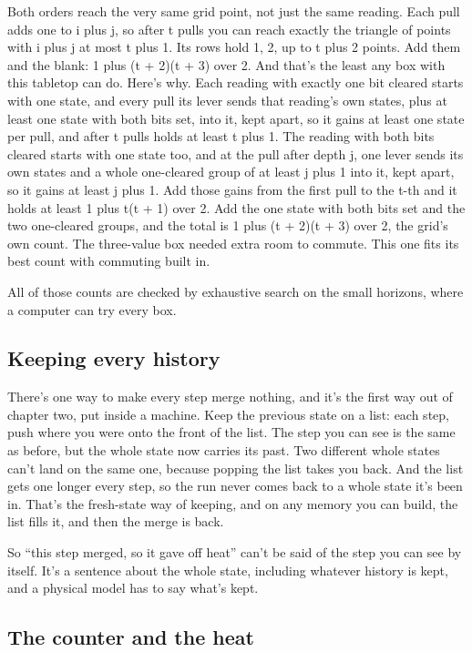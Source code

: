 \documentclass[11pt,twoside]{article}
\theoremstyle{thielethm}
\theoremstyle{thieledef}
\theoremstyle{thieledef}
\theoremstyle{thieledef}
\theoremstyle{thielethm}
\theoremstyle{thieleobs}
\theoremstyle{thielethm}
\begin{document}
Both orders reach the very same grid point, not just the same reading. Each pull adds one to i plus j, so after t pulls you can reach exactly the triangle of points with i plus j at most t plus 1. Its rows hold 1, 2, up to t plus 2 points. Add them and the blank: 1 plus (t + 2)(t + 3) over 2. And that's the least any box with this tabletop can do. Here's why. Each reading with exactly one bit cleared starts with one state, and every pull its lever sends that reading's own states, plus at least one state with both bits set, into it, kept apart, so it gains at least one state per pull, and after t pulls holds at least t plus 1. The reading with both bits cleared starts with one state too, and at the pull after depth j, one lever sends its own states and a whole one-cleared group of at least j plus 1 into it, kept apart, so it gains at least j plus 1. Add those gains from the first pull to the t-th and it holds at least 1 plus t(t + 1) over 2. Add the one state with both bits set and the two one-cleared groups, and the total is 1 plus (t + 2)(t + 3) over 2, the grid's own count. The three-value box needed extra room to commute. This one fits its best count with commuting built in.

All of those counts are checked by exhaustive search on the small horizons, where a computer can try every box.

\subsection{Keeping every history}

There's one way to make every step merge nothing, and it's the first way out of chapter two, put inside a machine. Keep the previous state on a list: each step, push where you were onto the front of the list. The step you can see is the same as before, but the whole state now carries its past. Two different whole states can't land on the same one, because popping the list takes you back. And the list gets one longer every step, so the run never comes back to a whole state it's been in. That's the fresh-state way of keeping, and on any memory you can build, the list fills it, and then the merge is back.

So ``this step merged, so it gave off heat'' can't be said of the step you can see by itself. It's a sentence about the whole state, including whatever history is kept, and a physical model has to say what's kept.

\subsection{The counter and the heat}
\end{document}
